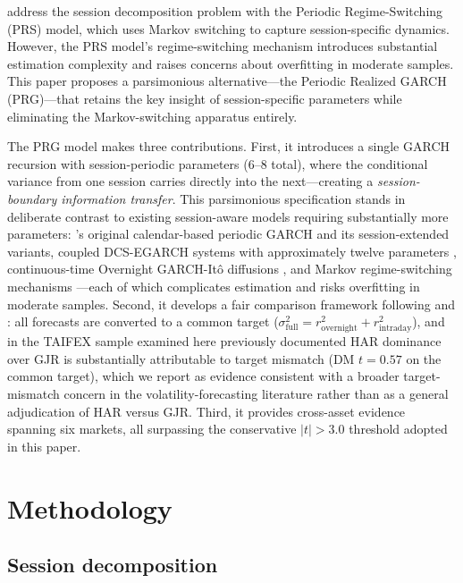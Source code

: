 \documentclass[11pt,a4paper]{article}
\begin{document}
\citet{Lai2024} address the session decomposition problem with the Periodic Regime-Switching (PRS) model, which uses Markov switching to capture session-specific dynamics. However, the PRS model's regime-switching mechanism introduces substantial estimation complexity and raises concerns about overfitting in moderate samples. This paper proposes a parsimonious alternative---the Periodic Realized GARCH (PRG)---that retains the key insight of session-specific parameters while eliminating the Markov-switching apparatus entirely.

The PRG model makes three contributions. First, it introduces a single GARCH recursion with session-periodic parameters (6--8 total), where the conditional variance from one session carries directly into the next---creating a \emph{session-boundary information transfer}. This parsimonious specification stands in deliberate contrast to existing session-aware models requiring substantially more parameters: \citet{Bollerslev1996}'s original calendar-based periodic GARCH and its session-extended variants, coupled DCS-EGARCH systems with approximately twelve parameters \citep{Linton2020}, continuous-time Overnight GARCH-It\^{o} diffusions \citep{Kim2023}, and Markov regime-switching mechanisms \citep{Lai2024}---each of which complicates estimation and risks overfitting in moderate samples. Second, it develops a fair comparison framework following \citet{Hansen2006} and \citet{Patton2011}: all forecasts are converted to a common target ($\sigma^2_{\text{full}} = r^2_{\text{overnight}} + r^2_{\text{intraday}}$), and in the TAIFEX sample examined here previously documented HAR dominance over GJR is substantially attributable to target mismatch (DM $t = 0.57$ on the common target), which we report as evidence consistent with a broader target-mismatch concern in the volatility-forecasting literature rather than as a general adjudication of HAR versus GJR. Third, it provides cross-asset evidence spanning six markets, all surpassing the conservative $|t| > 3.0$ threshold adopted in this paper.


\section{Methodology}

\subsection{Session decomposition}
\end{document}
